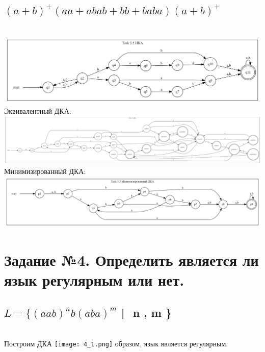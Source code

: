 \documentclass{article}
\begin{document}
\subsection{$ (a+b)^+(aa + abab + bb + baba)(a+b)^+$}\\ 
\newline\includegraphics[scale=0.3]{3_5_1.png}      
\newline Эквивалентный ДКА:
\newline\includegraphics[scale=0.14]{3_5_2.png} 
\newline Минимизированный ДКА:
\newline\includegraphics[scale=0.3]{3_5_3.png}   

\newpage\section{Задание №4. Определить является ли язык регулярным или нет.}
\subsection{$L = \{(aab)^n b(aba)^m  $ | $ $ n , m  \}}\\ 
Построим ДКА
\newline\texttt{[image: 4\_1.png]}  
 образом, язык является регулярным.
\end{document}
